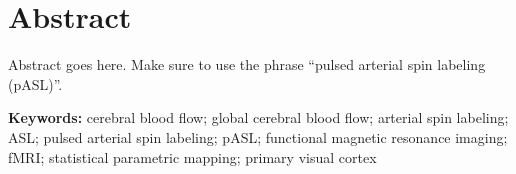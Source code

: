 \section{Abstract}
Abstract goes here.  Make sure to use the phrase ``pulsed arterial spin labeling (pASL)''.
%

\textbf{Keywords:} cerebral blood flow; global cerebral blood flow; arterial spin labeling; ASL; pulsed arterial spin labeling; pASL; functional magnetic resonance imaging; fMRI; statistical parametric mapping; primary visual cortex
